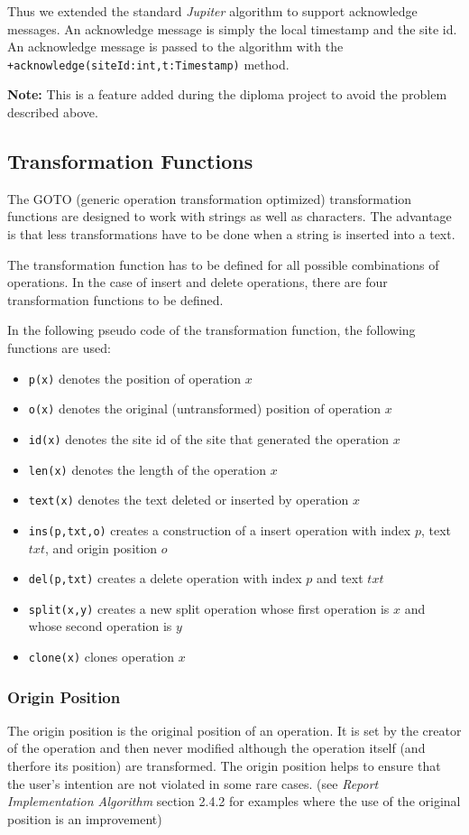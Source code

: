 Thus we extended the standard \emph{Jupiter} algorithm to support acknowledge
messages. An acknowledge message is simply the local timestamp and the site
id. An acknowledge message is passed to the algorithm with the
\texttt{+acknowledge(siteId:int,t:Timestamp)} method.

\textbf{Note:} This is a feature added during the diploma project to
avoid the problem described above.




\subsection{Transformation Functions}
The GOTO (generic operation transformation optimized) transformation functions 
are designed to work with strings as well as characters. The advantage is that 
less transformations have to be done when a string is inserted into a text. 

The transformation function has to be defined for all possible combinations
of operations. In the case of insert and delete operations, there are four
transformation functions to be defined.

In the following pseudo code of the transformation function, the following
functions are used:
\begin{itemize}
 \item \texttt{p(x)} denotes the position of operation $x$
 \item \texttt{o(x)} denotes the original (untransformed) position of operation $x$
 \item \texttt{id(x)} denotes the site id of the site that generated the operation $x$
 \item \texttt{len(x)} denotes the length of the operation $x$
 \item \texttt{text(x)} denotes the text deleted or inserted by operation $x$
 \item \texttt{ins(p,txt,o)} creates a construction of a insert operation with index $p$, text $txt$, and origin position $o$
 \item \texttt{del(p,txt)} creates a delete operation with index $p$ and text $txt$
 \item \texttt{split(x,y)} creates a new split operation whose first operation is $x$ and whose second operation is $y$
 \item \texttt{clone(x)} clones operation $x$
\end{itemize}


\subsubsection{Origin Position}
The origin position is the original position of an operation. It is set by
the creator of the operation and then never modified although the operation
itself (and therfore its position) are transformed. The origin position 
helps to ensure that the user's intention are not violated in some rare
cases. (see \emph{Report Implementation Algorithm} section 2.4.2 for 
examples where the use of the original position is an improvement)


